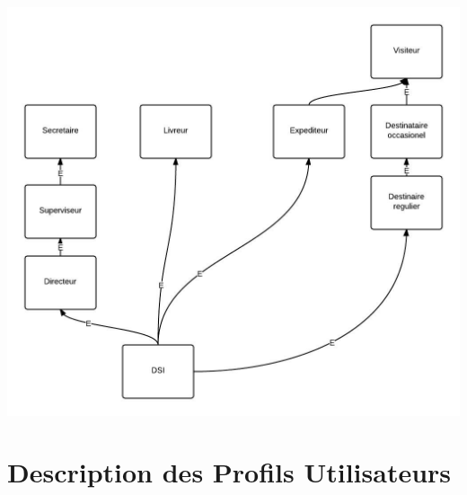 \documentclass{report}
\begin{document}
\includegraphics[scale = 0.25]{images/GPU.jpeg}

\section{Description des Profils Utilisateurs}
\end{document}
